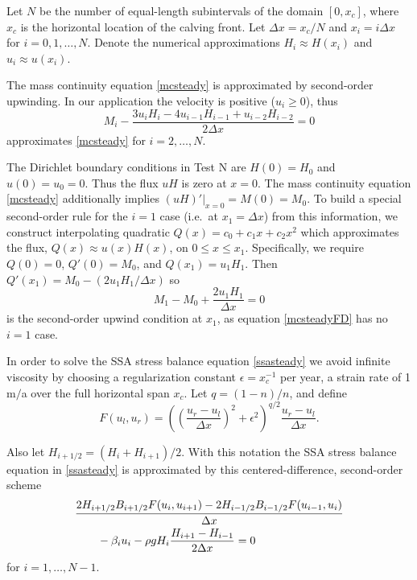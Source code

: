 \documentclass[twocolumn,letterpaper]{igs}
\newcommand{\eps}{\epsilon}
\begin{document}
Let $N$ be the number of equal-length subintervals of the domain $[0,x_c]$, where $x_c$ is the horizontal location of the calving front.  Let $\Delta x = x_c/N$ and $x_i = i \Delta x$ for $i=0,1,\dots,N$.  %
Denote the numerical approximations $H_i\approx H(x_i)$ and $u_i \approx u(x_i)$.

The mass continuity equation \eqref{mcsteady} is approximated by second-order upwinding.  In our application the velocity is positive ($u_i\ge 0$), thus
\begin{equation}
M_i - \frac{3 u_i H_i - 4 u_{i-1} H_{i-1} + u_{i-2} H_{i-2}}{2 \Delta x} = 0 \label{mcsteadyFD}
\end{equation}
approximates \eqref{mcsteady} for $i=2,\dots,N$.

The Dirichlet boundary conditions in Test N are $H(0)=H_0$ and $u(0)=u_0=0$.  Thus the flux $uH$ is zero at $x=0$.  The mass continuity equation \eqref{mcsteady} additionally implies $(uH)'\big|_{x=0}=M(0)=M_0$.  To build a special second-order rule for the $i=1$ case (i.e.~at $x_1 = \Delta x$) from this information, we construct interpolating quadratic $Q(x) = c_0 + c_1 x + c_2 x^2$ which approximates the flux, $Q(x) \approx u(x)H(x)$, on $0 \le x \le x_1$.  Specifically, we require $Q(0)=0$, $Q'(0)=M_0$, and $Q(x_1) = u_1 H_1$.  Then $Q'(x_1) = M_0 - (2 u_1 H_1/  \Delta x)$ so
\begin{equation}
M_1 - M_0 + \frac{2 u_1 H_1}{\Delta x} = 0 \label{mcbcFD}
\end{equation}
is the second-order upwind condition at $x_1$, as equation \eqref{mcsteadyFD} has no $i=1$ case.

In order to solve the SSA stress balance equation \eqref{ssasteady} we avoid infinite viscosity by choosing a regularization constant $\eps=x_c^{-1}$ per year, a strain rate of 1 m$/$a over the full horizontal span $x_c$.  Let $q = (1-n)/n$, and define
\begin{equation}
F(u_l,u_r) = \left(\left(\frac{u_r-u_l}{\Delta x}\right)^2 + \eps^2\right)^{q/2} \frac{u_r-u_l}{\Delta x}.  \label{viscregFD}
\end{equation}

Also let $H_{i+1/2} = (H_i+H_{i+1})/2$.  With this notation the SSA stress balance equation in \eqref{ssasteady} is approximated by this centered-difference, second-order scheme
\begin{align}
&\frac{2 H_{i+1/2} B_{i+1/2} F(u_i,u_{i+1}) - 2 H_{i-1/2} B_{i-1/2} F(u_{i-1},u_i)}{\Delta x} \notag \\
&\qquad - \beta_i u_i - \rho g H_i \frac{H_{i+1}-H_{i-1}}{2\Delta x} = 0  \label{SSAFD}
\end{align}
for $i=1,\dots,N-1$.
\end{document}
